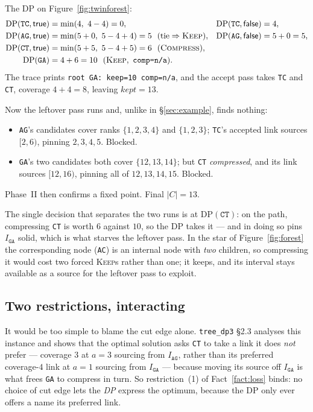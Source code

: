 \documentclass[11pt,a4paper]{article}
\theoremstyle{definition}
\theoremstyle{plain}
\theoremstyle{remark}
\newcommand{\KEEP}{\textnormal{\textsc{Keep}}}
\newcommand{\COMP}{\textnormal{\textsc{Compress}}}
\begin{document}
The DP on Figure~\ref{fig:twinforest}:
\begin{align*}
  \mathrm{DP}(\mathtt{TC},\mathsf{true}) &= \min(4,\ 4-4) = 0,
  &\mathrm{DP}(\mathtt{TC},\mathsf{false}) &= 4, \\
  \mathrm{DP}(\mathtt{AG},\mathsf{true}) &= \min(5+0,\ 5-4+4) = 5
  \ \ (\text{tie} \Rightarrow \KEEP),
  &\mathrm{DP}(\mathtt{AG},\mathsf{false}) &= 5+0 = 5, \\
  \mathrm{DP}(\mathtt{CT},\mathsf{true}) &= \min(5+5,\ 5-4+5) = 6
  \ \ (\COMP), \\
  \mathrm{DP}(\mathtt{GA}) &= 4 + 6 = 10 \ \ (\KEEP,\ \texttt{comp=n/a}).
\end{align*}
The trace prints \texttt{root GA: keep=10 comp=n/a}, and the accept pass
takes \texttt{TC} and \texttt{CT}, coverage $4 + 4 = 8$, leaving
$\mathit{kept} = 13$.

Now the leftover pass runs and, unlike in \S\ref{sec:example}, finds
nothing:
\begin{itemize}
\item \texttt{AG}'s candidates cover ranks $\{1,2,3,4\}$ and
  $\{1,2,3\}$; \texttt{TC}'s accepted link sources $[2,6)$, pinning
  $2,3,4,5$. Blocked.
\item \texttt{GA}'s two candidates both cover $\{12,13,14\}$; but
  \texttt{CT} \emph{compressed}, and its link sources $[12,16)$, pinning
  all of $12,13,14,15$. Blocked.
\end{itemize}
Phase~II then confirms a fixed point. Final $|C| = 13$.

The single decision that separates the two runs is at
$\mathrm{DP}(\mathtt{CT})$: on the path, compressing \texttt{CT} is
worth $6$ against $10$, so the DP takes it --- and in doing so pins
$I_{\mathtt{GA}}$ solid, which is what starves the leftover pass. In the
star of Figure~\ref{fig:forest} the corresponding node (\texttt{AC}) is
an internal node with \emph{two} children, so compressing it would cost
two forced \KEEP{}s rather than one; it keeps, and its interval stays
available as a source for the leftover pass to exploit.

\subsection{Two restrictions, interacting}

It would be too simple to blame the cut edge alone. \texttt{tree\_dp3}
\S2.3 analyses this instance and shows that the optimal solution asks
\texttt{CT} to take a link it does \emph{not} prefer --- coverage $3$ at
$a = 3$ sourcing from $I_{\mathtt{AG}}$, rather than its preferred
coverage-$4$ link at $a = 1$ sourcing from $I_{\mathtt{GA}}$ --- because
moving its source off $I_{\mathtt{GA}}$ is what frees \texttt{GA} to
compress in turn. So restriction~(1) of Fact~\ref{fact:loss} binds: no
choice of cut edge lets the \emph{DP} express the optimum, because the
DP only ever offers a name its preferred link.
\end{document}
